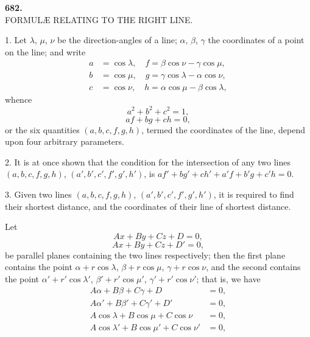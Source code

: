 \documentclass[11pt,a4paper]{article}
\begin{document}

\begin{center}
\textbf{682.}\\[6pt]
\large FORMUL\AE{} RELATING TO THE RIGHT LINE.
\end{center}

\medskip


\medskip

1. Let $\lambda$, $\mu$, $\nu$ be the direction-angles of a line; $\alpha$, $\beta$, $\gamma$ the coordinates of a point on the line; and write
\begin{align*}
a &= \cos \lambda,\quad f = \beta \cos \nu - \gamma \cos \mu,\\
b &= \cos \mu,\quad g = \gamma \cos \lambda - \alpha \cos \nu,\\
c &= \cos \nu,\quad h = \alpha \cos \mu - \beta \cos \lambda,
\end{align*}
whence
\[
a^{2} + b^{2} + c^{2} = 1,
\]
\[
af + bg + ch = 0,
\]
or the six quantities $(a, b, c, f, g, h)$, termed the coordinates of the line, depend upon four arbitrary parameters.

\medskip

2. It is at once shown that the condition for the intersection of any two lines $(a, b, c, f, g, h)$, $(a', b', c', f', g', h')$, is $af' + bg' + ch' + a'f + b'g + c'h = 0$.

\medskip

3. Given two lines $(a, b, c, f, g, h)$, $(a', b', c', f', g', h')$, it is required to find their shortest distance, and the coordinates of their line of shortest distance.

Let
\[
Ax + By + Cz + D = 0,
\]
\[
Ax + By + Cz + D' = 0,
\]
be parallel planes containing the two lines respectively; then the first plane contains the point $\alpha + r\cos\lambda$, $\beta + r\cos\mu$, $\gamma + r\cos\nu$, and the second contains the point $\alpha' + r'\cos\lambda'$, $\beta' + r'\cos\mu'$, $\gamma' + r'\cos\nu'$; that is, we have
\begin{align*}
A\alpha + B\beta + C\gamma + D &= 0,\\
A\alpha' + B\beta' + C\gamma' + D' &= 0,\\
A\cos\lambda + B\cos\mu + C\cos\nu &= 0,\\
A\cos\lambda' + B\cos\mu' + C\cos\nu' &= 0,
\end{align*}
\end{document}
